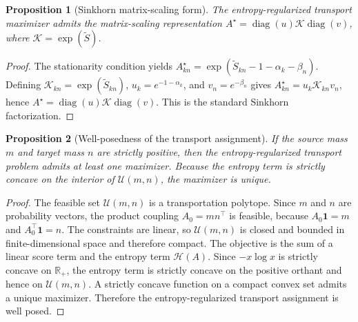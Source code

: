 \documentclass[journal]{IEEEtran}
\newtheorem{proposition}{Proposition}
\begin{document}
\begin{proposition}[Sinkhorn matrix-scaling form]
The entropy-regularized transport maximizer admits the matrix-scaling representation \(A^\star = \operatorname{diag}(u)\mathcal{K}\operatorname{diag}(v)\), where \(\mathcal{K} = \exp(\tilde{S})\).
\end{proposition}
\begin{proof}
The stationarity condition yields \(A^\star_{kn} = \exp(\tilde{S}_{kn} - 1 - \alpha_k - \beta_n)\). Defining \(\mathcal{K}_{kn} = \exp(\tilde{S}_{kn})\), \(u_k = e^{-1-\alpha_k}\), and \(v_n = e^{-\beta_n}\) gives \(A^\star_{kn} = u_k \mathcal{K}_{kn} v_n\), hence \(A^\star = \operatorname{diag}(u)\mathcal{K}\operatorname{diag}(v)\). This is the standard Sinkhorn factorization.
\end{proof}

\begin{proposition}[Well-posedness of the transport assignment]
If the source mass \(m\) and target mass \(n\) are strictly positive, then the entropy-regularized transport problem admits at least one maximizer. Because the entropy term is strictly concave on the interior of \(\mathcal{U}(m,n)\), the maximizer is unique.
\end{proposition}
\begin{proof}
The feasible set \(\mathcal{U}(m,n)\) is a transportation polytope. Since \(m\) and \(n\) are probability vectors, the product coupling \(A_0 = mn^\top\) is feasible, because \(A_0\mathbf{1}=m\) and \(A_0^\top\mathbf{1}=n\). The constraints are linear, so \(\mathcal{U}(m,n)\) is closed and bounded in finite-dimensional space and therefore compact. The objective is the sum of a linear score term and the entropy term \(\mathcal{H}(A)\). Since \(-x\log x\) is strictly concave on \(\mathbb{R}_+\), the entropy term is strictly concave on the positive orthant and hence on \(\mathcal{U}(m,n)\). A strictly concave function on a compact convex set admits a unique maximizer. Therefore the entropy-regularized transport assignment is well posed.
\end{proof}
\end{document}
